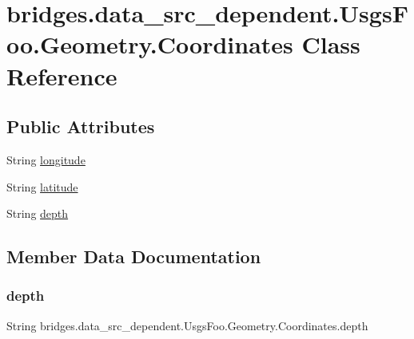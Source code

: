 \hypertarget{classbridges_1_1data__src__dependent_1_1_usgs_foo_1_1_geometry_1_1_coordinates}{}\section{bridges.\+data\+\_\+src\+\_\+dependent.\+Usgs\+Foo.\+Geometry.\+Coordinates Class Reference}
\label{classbridges_1_1data__src__dependent_1_1_usgs_foo_1_1_geometry_1_1_coordinates}
\subsection*{Public Attributes}
\begin{DoxyCompactItemize}
\item 
String \mbox{\hyperlink{classbridges_1_1data__src__dependent_1_1_usgs_foo_1_1_geometry_1_1_coordinates_a45f2a0dc4220eb4a1e8ec576101f9633}{longitude}}
\item 
String \mbox{\hyperlink{classbridges_1_1data__src__dependent_1_1_usgs_foo_1_1_geometry_1_1_coordinates_a8ab648886a19cd5d07f330e1558b8175}{latitude}}
\item 
String \mbox{\hyperlink{classbridges_1_1data__src__dependent_1_1_usgs_foo_1_1_geometry_1_1_coordinates_aa566d321ac49828fffd447821bd4e72d}{depth}}
\end{DoxyCompactItemize}


\subsection{Member Data Documentation}
\mbox{\label{classbridges_1_1data__src__dependent_1_1_usgs_foo_1_1_geometry_1_1_coordinates_aa566d321ac49828fffd447821bd4e72d}} 
\subsubsection{\texorpdfstring{depth}{depth}}
{\footnotesize\ttfamily String bridges.\+data\+\_\+src\+\_\+dependent.\+Usgs\+Foo.\+Geometry.\+Coordinates.\+depth}

